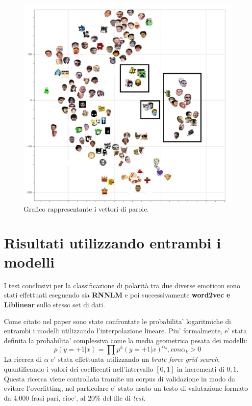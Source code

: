 \documentclass[a4paper,12pt,openright,twoside]{report}
\theoremstyle{definition}
\begin{document}
\begin{figure}[H]
	\centering
	\includegraphics[scale=0.4]{Immagini/tsne.png}
	\caption{Grafico rappresentante i vettori di parole.}
	\label{fig:tSNE}
\end{figure}

\section{Risultati utilizzando entrambi i modelli}
I test conclusivi per la classificazione di polarità tra due diverse emoticon
sono stati effettuati eseguendo sia \textbf{RNNLM} e poi successivamente \textbf{word2vec e Liblinear} sullo stesso set di dati.

Come citato nel paper
sono state confrontate le probabilita' logaritmiche di entrambi i modelli utilizzando l'interpolazione lineare.
Piu' formalmente, e' stata definita la probabilita' complessiva come la media geometrica pesata
dei modelli:
\begin{equation}
	p(y=+1|x)=\prod p^k(y=+1|x)^{\alpha_k}, con \alpha_k > 0
	\label{eq:media}
\end{equation}
La ricerca di $\alpha$ e' stata effettuata utilizzando un \emph{brute force grid search}, quantificando
i valori dei coefficenti nell'intervallo $[0,1]$ in incrementi di $0,1$.
Questa ricerca viene controllata tramite un corpus di validazione in modo da evitare l'overfitting, nel particolare
e' stato usato un testo di valutazione formato da 4.000 frasi pari, cioe', al $20\%$ del file di \emph{test}. 
\end{document}
